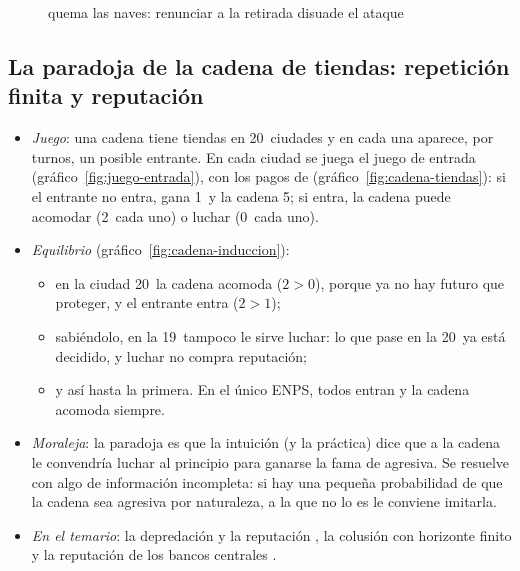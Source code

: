 \documentclass[11pt]{article}
\begin{document}
\begin{figure}[H]
\centering
\caption{ quema las naves: renunciar a la retirada disuade el ataque}\label{fig:quemar-naves}
\end{figure}

\subsection*{La paradoja de la cadena de tiendas: repetición finita y reputación}

\begin{itemize}
\item \emph{Juego}\nocite{Selten1978Chain}: una cadena tiene tiendas en 20~ciudades y en cada una aparece, por turnos, un posible entrante. En cada ciudad se juega el juego de entrada (gráfico~\ref{fig:juego-entrada}), con los pagos de \textcite{Selten1978Chain} (gráfico~\ref{fig:cadena-tiendas}): si el entrante no entra, gana 1~y la cadena 5; si entra, la cadena puede acomodar (2~cada uno) o luchar (0~cada uno).
\item \emph{Equilibrio} (gráfico~\ref{fig:cadena-induccion}):
  \begin{itemize}
  \item en la ciudad 20~la cadena acomoda ($2>0$), porque ya no hay futuro que proteger, y el entrante entra ($2>1$);
  \item sabiéndolo, en la 19~tampoco le sirve luchar: lo que pase en la 20~ya está decidido, y luchar no compra reputación;
  \item y así hasta la primera. En el único ENPS, todos entran y la cadena acomoda siempre.
  \end{itemize}
\item \emph{Moraleja}: la paradoja es que la intuición (y la práctica) dice que a la cadena le convendría luchar al principio para ganarse la fama de agresiva. Se resuelve con algo de información incompleta: si hay una pequeña probabilidad de que la cadena sea agresiva por naturaleza, a la que no lo es le conviene imitarla\nocite{KrepsWilson1982Reputation,MilgromRoberts1982Predation}.
\item \emph{En el temario}: la depredación y la reputación , la colusión con horizonte finito  y la reputación de los bancos centrales .
\end{itemize}
\end{document}
